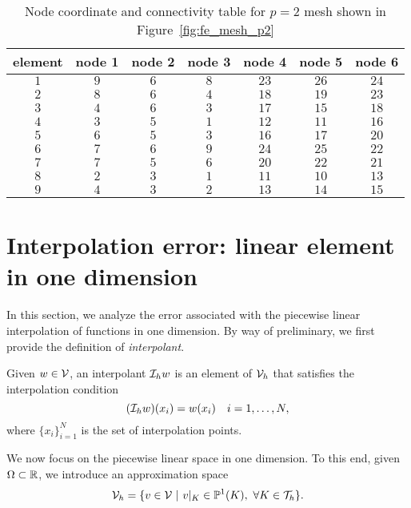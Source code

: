 \begin{table}
{    \begin{tabular}{c|cccccc}
      element & node 1 & node 2 & node 3 & node 4 & node 5 & node 6\\
      \hline
$1$ & $9$ & $6$ & $8$ & $23$ & $26$ & $24$ \\ 
$2$ & $8$ & $6$ & $4$ & $18$ & $19$ & $23$ \\ 
$3$ & $4$ & $6$ & $3$ & $17$ & $15$ & $18$ \\ 
$4$ & $3$ & $5$ & $1$ & $12$ & $11$ & $16$ \\ 
$5$ & $6$ & $5$ & $3$ & $16$ & $17$ & $20$ \\ 
$6$ & $7$ & $6$ & $9$ & $24$ & $25$ & $22$ \\ 
$7$ & $7$ & $5$ & $6$ & $20$ & $22$ & $21$ \\ 
$8$ & $2$ & $3$ & $1$ & $11$ & $10$ & $13$ \\ 
$9$ & $4$ & $3$ & $2$ & $13$ & $14$ & $15$ \\ 
    \end{tabular}
  }
  \caption{Node coordinate and connectivity table for $p=2$ mesh shown in Figure~\ref{fig:fe_mesh_p2}}
\end{table}



\section{Interpolation error: linear element in one dimension}
\label{sec:fe_interp_1d}
In this section, we analyze the error associated with the piecewise linear interpolation of functions in one dimension. By way of preliminary, we first provide the definition of \emph{interpolant}.
\begin{definition}[interpolant]
Given $w \in \mathcal{V}$, an interpolant $\mathcal{I}_h w$ is an element of $\mathcal{V}_h$ that satisfies the interpolation condition
\begin{equation*}
  (\mathcal{I}_h w)(x_i) = w(x_i) \quad i = 1,\dots, N,
\end{equation*}
where $\{x_i \}_{i=1}^N$ is the set of interpolation points.
\end{definition}

We now focus on the piecewise linear space in one dimension.  To this end, given $\Omega \subset \mathbb{R}$, we introduce an approximation space
\begin{equation*}
  \mathcal{V}_h = \{ v \in \mathcal{V} \ | \ v|_K \in \mathbb{P}^1(K), \ \forall K \in \mathcal{T}_h \}.
\end{equation*}

